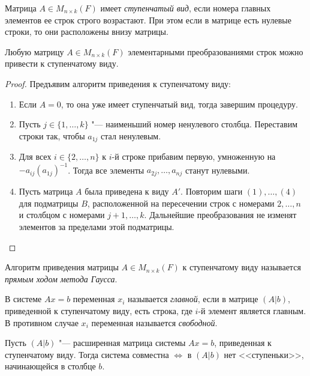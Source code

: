 \begin{definition}
	Матрица $A \in M_{n \times k}(F)$ имеет \textit{ступенчатый вид}, если номера главных элементов ее строк строго возрастают. При этом если в матрице есть нулевые строки, то они расположены внизу матрицы.
\end{definition}

\begin{theorem}
	Любую матрицу $A \in M_{n \times k}(F)$ элементарными преобразованиями строк можно привести к ступенчатому виду.
\end{theorem}

\begin{proof}
	Предъявим алгоритм приведения к ступенчатому виду:
	\begin{enumerate}
		\item Если $A = 0$, то она уже имеет ступенчатый вид, тогда завершим процедуру.
		\item Пусть $j \in \{1, \dotsc, k\}$ "--- наименьший номер ненулевого столбца. Переставим строки так, чтобы $a_{1j}$ стал ненулевым.
		\item Для всех $i \in \{2, \dots, n\}$ к $i$-й строке прибавим первую, умноженную на $-a_{ij}(a_{1j})^{-1}$. Тогда все элементы $a_{2j}, \dots, a_{nj}$ станут нулевыми.
		\item Пусть матрица $A$ была приведена к виду $A'$. Повторим шаги $(1), \dotsc, (4)$ для подматрицы $B$, расположенной на пересечении строк с номерами $2, \dotsc, n$ и столбцом с номерами $j + 1, \dotsc, k$. Дальнейшие преобразования не изменят элементов за пределами этой подматрицы.\qedhere
	\end{enumerate}
\end{proof}

\begin{definition}
	Алгоритм приведения матрицы $A \in M_{n \times k}(F)$ к ступенчатому виду называется \textit{прямым ходом метода Гаусса}.
\end{definition}

\begin{definition}
	В системе $Ax = b$ переменная $x_i$ называется \textit{главной}, если в матрице $(A|b)$, приведенной к ступенчатому виду, есть строка, где $i$-й элемент является главным. В противном случае $x_i$ переменная называется \textit{свободной}.
\end{definition}

\begin{theorem}
	Пусть $(A|b)$ "--- расширенная матрица системы $Ax = b$, приведенная к ступенчатому виду. Тогда система совместна $\Leftrightarrow$ в $(A|b)$ нет <<ступеньки>>, начинающейся в столбце $b$.
\end{theorem}

